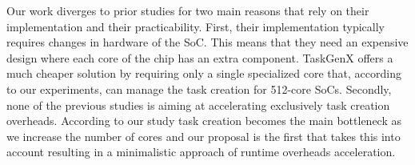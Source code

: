 Our work diverges to prior studies for two main reasons that rely on their implementation and their practicability. 
First, their implementation typically requires changes in hardware of the SoC.
	This means that they need an expensive design where each core of the chip has an extra component.
	TaskGenX offers a much cheaper solution by requiring only a single specialized core that, according to our experiments, can manage the task creation for 512-core SoCs.
Secondly, none of the previous studies is aiming at accelerating exclusively task creation overheads. 
	According to our study task creation becomes the main bottleneck as we increase the number of cores and our proposal is the first that takes this into account resulting in a minimalistic approach of runtime overheads acceleration.



